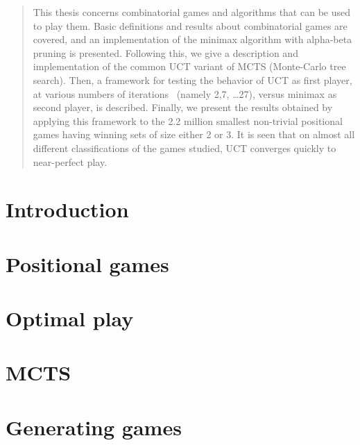 \documentclass[12pt]{article}
\begin{document}
\maketitle

\begin{abstract}
This thesis concerns combinatorial games and algorithms that can be used to play them.
Basic definitions and results about combinatorial games are covered, and an implementation of the minimax algorithm with alpha-beta pruning is presented.
Following this, we give a description and implementation of the common UCT variant of MCTS (Monte-Carlo tree search).
Then, a framework for testing the behavior of UCT as first player, at various numbers of iterations ~(namely 2,7, \dots 27), versus minimax as second player, is described.
Finally, we present the results obtained by applying this framework to the 2.2 million smallest non-trivial positional games having winning sets of size either 2 or 3.
It is seen that on almost all different classifications of the games studied, UCT converges quickly to near-perfect play.
\end{abstract}

\tableofcontents

\section{Introduction}
\label{sec:introduction}


\section{Positional games}
\label{sec:positional_games}


\section{Optimal play}
\label{sec:optimal_play}


\section{MCTS}
\label{sec:mcts}


\section{Generating games}
\label{sec:generating_games}

\end{document}
